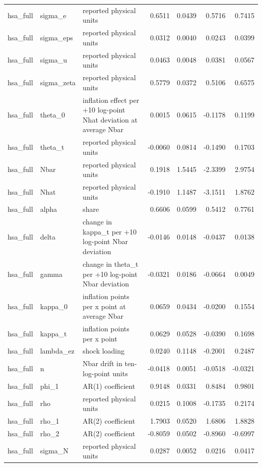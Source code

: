 \begin{tabular}{lllrrrr}
hsa\_full & sigma\_e & reported physical units & 0.6511 & 0.0439 & 0.5716 & 0.7415 \\
hsa\_full & sigma\_eps & reported physical units & 0.0312 & 0.0040 & 0.0243 & 0.0399 \\
hsa\_full & sigma\_u & reported physical units & 0.0463 & 0.0048 & 0.0381 & 0.0567 \\
hsa\_full & sigma\_zeta & reported physical units & 0.5779 & 0.0372 & 0.5106 & 0.6575 \\
hsa\_full & theta\_0 & inflation effect per +10 log-point Nhat deviation at average Nbar & 0.0015 & 0.0615 & -0.1178 & 0.1199 \\
hsa\_full & theta\_t & reported physical units & -0.0060 & 0.0814 & -0.1490 & 0.1703 \\
hsa\_full & Nbar & reported physical units & 0.1918 & 1.5445 & -2.3399 & 2.9754 \\
hsa\_full & Nhat & reported physical units & -0.1910 & 1.1487 & -3.1511 & 1.8762 \\
hsa\_full & alpha & share & 0.6606 & 0.0599 & 0.5412 & 0.7761 \\
hsa\_full & delta & change in kappa\_t per +10 log-point Nbar deviation & -0.0146 & 0.0148 & -0.0437 & 0.0138 \\
hsa\_full & gamma & change in theta\_t per +10 log-point Nbar deviation & -0.0321 & 0.0186 & -0.0664 & 0.0049 \\
hsa\_full & kappa\_0 & inflation points per x point at average Nbar & 0.0659 & 0.0434 & -0.0200 & 0.1554 \\
hsa\_full & kappa\_t & inflation points per x point & 0.0629 & 0.0528 & -0.0390 & 0.1698 \\
hsa\_full & lambda\_ez & shock loading & 0.0240 & 0.1148 & -0.2001 & 0.2487 \\
hsa\_full & n & Nbar drift in ten-log-point units & -0.0418 & 0.0051 & -0.0518 & -0.0321 \\
hsa\_full & phi\_1 & AR(1) coefficient & 0.9148 & 0.0331 & 0.8484 & 0.9801 \\
hsa\_full & rho & reported physical units & 0.0215 & 0.1008 & -0.1735 & 0.2174 \\
hsa\_full & rho\_1 & AR(2) coefficient & 1.7903 & 0.0520 & 1.6806 & 1.8828 \\
hsa\_full & rho\_2 & AR(2) coefficient & -0.8059 & 0.0502 & -0.8960 & -0.6997 \\
hsa\_full & sigma\_N & reported physical units & 0.0287 & 0.0052 & 0.0216 & 0.0417 \\

\end{tabular}
